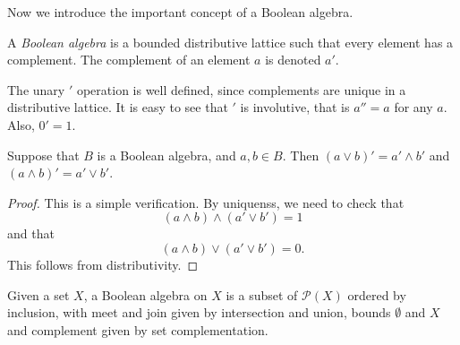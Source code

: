 \documentclass{owmaths}
\begin{document}
Now we introduce the important concept of a Boolean algebra.
\begin{definition}
    A \emph{Boolean algebra} is a bounded distributive lattice 
    such that every element has a complement. The complement of an element
    $a$ is denoted $a'$.
\end{definition}    
\begin{remark}
    The unary $'$ operation is well defined, since complements are unique
    in a distributive lattice. It is easy to see that $'$ is involutive, that is
    $a'' = a$ for any $a$. Also, $0' = 1$.
\end{remark}
\begin{proposition}
    Suppose that $B$ is a Boolean algebra, and $a,b \in B$. Then $(a\vee b)' = a'\wedge b'$
    and $(a \wedge b)' = a' \vee b'$.
\end{proposition}
\begin{proof}
    This is a simple verification. By uniquenss, we need to check that
    \begin{equation*}
        (a \wedge b) \wedge (a' \vee b') = 1
    \end{equation*}
    and that
    \begin{equation*}
        (a \wedge b) \vee (a' \vee b') = 0.
    \end{equation*}
    This follows from distributivity.
\end{proof} 

\begin{definition}
    Given a set $X$, a Boolean algebra on $X$ is a subset of $\mathcal{P}(X)$
    ordered by inclusion, with meet and join given by intersection and union,
    bounds $\emptyset$ and $X$ 
    and complement given by set complementation.
\end{definition}    
\end{document}
